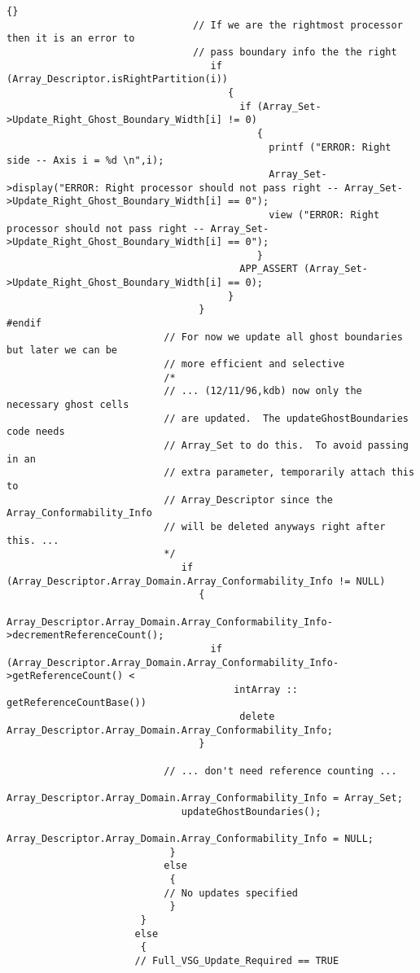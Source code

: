 \documentclass[10pt]{llncs}
\begin{document}
\begin{lstlisting}{}
                                // If we are the rightmost processor then it is an error to 
                                // pass boundary info the the right
                                   if (Array_Descriptor.isRightPartition(i))
                                      {
                                        if (Array_Set->Update_Right_Ghost_Boundary_Width[i] != 0)
                                           {
                                             printf ("ERROR: Right side -- Axis i = %d \n",i);
                                             Array_Set->display("ERROR: Right processor should not pass right -- Array_Set->Update_Right_Ghost_Boundary_Width[i] == 0");
                                             view ("ERROR: Right processor should not pass right -- Array_Set->Update_Right_Ghost_Boundary_Width[i] == 0");
                                           }
                                        APP_ASSERT (Array_Set->Update_Right_Ghost_Boundary_Width[i] == 0);
                                      }
                                 }
#endif
                           // For now we update all ghost boundaries but later we can be 
                           // more efficient and selective
                           /*
                           // ... (12/11/96,kdb) now only the necessary ghost cells
                           // are updated.  The updateGhostBoundaries code needs
                           // Array_Set to do this.  To avoid passing in an
                           // extra parameter, temporarily attach this to
                           // Array_Descriptor since the Array_Conformability_Info
                           // will be deleted anyways right after this. ...
                           */
                              if (Array_Descriptor.Array_Domain.Array_Conformability_Info != NULL)
                                 {
                                   Array_Descriptor.Array_Domain.Array_Conformability_Info->decrementReferenceCount();
                                   if (Array_Descriptor.Array_Domain.Array_Conformability_Info->getReferenceCount() < 
                                       intArray :: getReferenceCountBase())
                                        delete Array_Descriptor.Array_Domain.Array_Conformability_Info;
                                 }

                           // ... don't need reference counting ...
                              Array_Descriptor.Array_Domain.Array_Conformability_Info = Array_Set;
                              updateGhostBoundaries();
                              Array_Descriptor.Array_Domain.Array_Conformability_Info = NULL;
                            }
                           else
                            {
                           // No updates specified
                            }
                       }
                      else
                       {
                      // Full_VSG_Update_Required == TRUE


\end{lstlisting}
\end{document}
